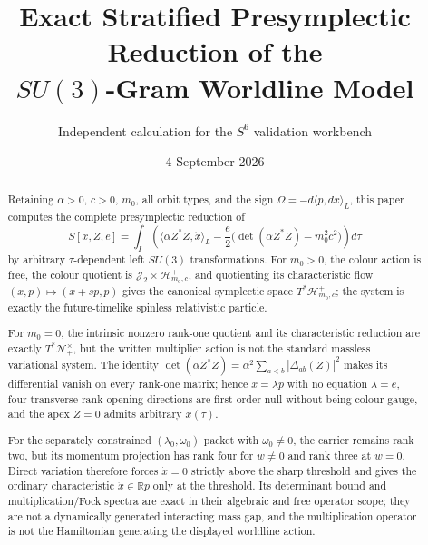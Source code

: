 \documentclass[11pt,letterpaper]{article}
\title{Exact Stratified Presymplectic Reduction of the\\
\texorpdfstring{$SU(3)$}{SU(3)}-Gram Worldline Model}
\author{Independent calculation for the \(S^6\) validation workbench}
\date{4 September 2026}
\begin{document}
\maketitle

\begin{abstract}
Retaining \(\alpha>0\), \(c>0\), \(m_0\), all orbit types, and the sign
\(\Omega=-d\langle p,dx\rangle_L\), this paper computes the complete
presymplectic reduction of
\[
 S[x,Z,e]=\int_I\left(\langle\alpha Z^*Z,\dot x\rangle_L
 -\frac e2\bigl(\det(\alpha Z^*Z)-m_0^2c^2\bigr)\right)d\tau
\]
by arbitrary \(\tau\)-dependent left \(SU(3)\) transformations.  For
\(m_0>0\), the colour action is free, the colour quotient is
\(\mathcal J_2\times\mathcal H^+_{m_0,c}\), and quotienting its
characteristic flow \((x,p)\mapsto(x+sp,p)\) gives the canonical
symplectic space \(T^*\mathcal H^+_{m_0,c}\); the system is exactly the
future-timelike spinless relativistic particle.

For \(m_0=0\), the intrinsic nonzero rank-one quotient and its
characteristic reduction are exactly
\(T^*\mathcal N_+^\times\), but the written multiplier action is not the
standard massless variational system.  The identity
\(\det(\alpha Z^*Z)=\alpha^2\sum_{a<b}|\Delta_{ab}(Z)|^2\) makes its
differential vanish on every rank-one matrix; hence
\(\dot x=\lambda p\) with no equation \(\lambda=e\), four transverse
rank-opening directions are first-order null without being colour gauge,
and the apex \(Z=0\) admits arbitrary \(x(\tau)\).

For the separately constrained \((\lambda_0,\omega_0)\) packet with
\(\omega_0\ne0\), the carrier remains rank two, but its momentum
projection has rank four for \(w\ne0\) and rank three at \(w=0\).
Direct variation therefore forces \(\dot x=0\) strictly above the sharp
threshold and gives the ordinary characteristic
\(\dot x\in\mathbb Rp\) only at the threshold.  Its determinant bound
and multiplication/Fock spectra are exact in their algebraic and free
operator scope; they are not a dynamically generated interacting mass
gap, and the multiplication operator is not the Hamiltonian generating
the displayed worldline action.
\end{abstract}

\tableofcontents
\linenumbers


\end{document}
